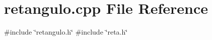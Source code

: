 \section{retangulo.\+cpp File Reference}
\label{retangulo_8cpp}
{\ttfamily \#include \char`\"{}retangulo.\+h\char`\"{}}\newline
{\ttfamily \#include \char`\"{}reta.\+h\char`\"{}}\newline
